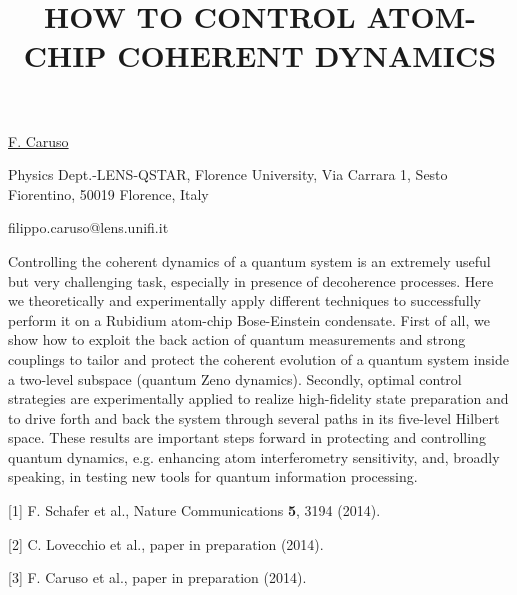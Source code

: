 \title{HOW TO CONTROL ATOM-CHIP COHERENT DYNAMICS}

\underline{F. Caruso} 

{\normalsize{
\vspace{-4mm}
Physics Dept.-LENS-QSTAR, Florence University,
Via Carrara 1,
Sesto Fiorentino, 50019 Florence,
Italy

\email filippo.caruso@lens.unifi.it}}

Controlling the coherent dynamics of a quantum system is an extremely useful but very challenging task, especially in presence of
decoherence processes. Here we theoretically and experimentally apply different techniques to successfully perform it on a Rubidium
atom-chip Bose-Einstein condensate. First of all, we show how to exploit the back action of quantum measurements and strong
couplings to tailor and protect the coherent evolution of a quantum system inside a two-level subspace (quantum Zeno dynamics).
Secondly, optimal control strategies are experimentally applied to realize high-fidelity state preparation and to drive forth and back
the system through several paths in its five-level Hilbert space. These results are important steps forward in protecting and
controlling quantum dynamics, e.g. enhancing atom interferometry sensitivity, and, broadly speaking, in testing new tools for
quantum information processing.

{\normalsize
[1] F. Schafer et al., Nature Communications \textbf{5}, 3194 (2014).
\vsp

[2] C. Lovecchio et al., paper in preparation (2014).
\vsp

[3] F. Caruso et al., paper in preparation (2014).
}

\vspace{\baselineskip}
